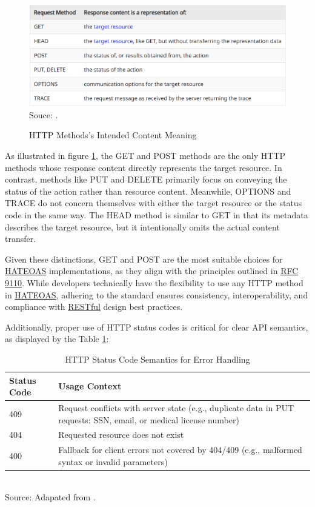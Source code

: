 \begin{figure}[H]
    \centering
    \caption{HTTP Methods's Intended Content Meaning}
    \includegraphics[width=1\linewidth]{figures/http_200_response_analyses.png}
    \label{fig:http-methods-intenteded-content}
    \footnotesize Souce: \cite{rfc9110}.
\end{figure}

As illustrated in figure \ref{fig:http-methods-intenteded-content}, the GET and POST methods are the only HTTP methods whose response content directly represents the target resource. In contrast, methods like PUT and DELETE primarily focus on conveying the status of the action rather than resource content. Meanwhile, OPTIONS and TRACE do not concern themselves with either the target resource or the status code in the same way. The HEAD method is similar to GET in that its metadata describes the target resource, but it intentionally omits the actual content transfer.

Given these distinctions, GET and POST are the most suitable choices for \hyperref[appendix:glossary]{HATEOAS} implementations, as they align with the principles outlined in \hyperref[appendix:glossary]{RFC} \href{https://www.rfc-editor.org/rfc/rfc9110.html}{9110}. While developers technically have the flexibility to use any HTTP method in \hyperref[appendix:glossary]{HATEOAS}, adhering to the standard ensures consistency, interoperability, and compliance with \hyperref[appendix:glossary]{RESTful} design best practices.

Additionally, proper use of HTTP status codes is critical for clear API semantics, as displayed by the Table \ref{http_error_codes}:

\begin{table}[H]
\centering
\caption{HTTP Status Code Semantics for Error Handling}
\label{http_error_codes}
\begin{tabular}{p{}p{}}
\toprule
\textbf{Status Code} & \textbf{Usage Context} \\
\midrule
409 & Request conflicts with server state (e.g., duplicate data in PUT requests: SSN, email, or medical license number) \\ \hline
404 & Requested resource does not exist \\ \hline
400 & Fallback for client errors not covered by 404/409 (e.g., malformed syntax or invalid parameters) \\
\bottomrule
\end{tabular}
\\ \footnotesize Source: Adapated from \cite{rfc9110}.
\end{table}

